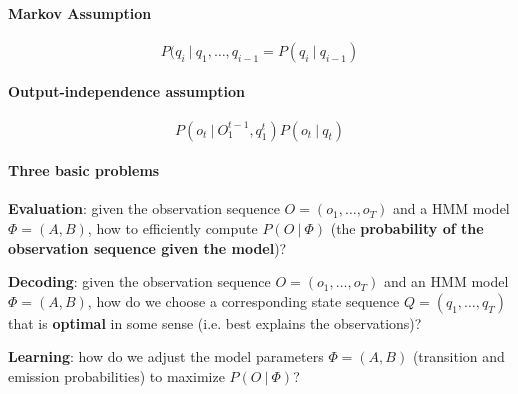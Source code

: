 \documentclass[10pt]{report}
\begin{document}
\paragraph{Markov Assumption} $$P(q_i\:|\:q_1,\ldots,q_{i-1} = P(q_i\:|\:q_{i-1})$$
\paragraph{Output-independence assumption} $$P(o_t\:|\:O_1^{t-1},q_1^t)P(o_t\:|\:q_t)$$
\paragraph{Three basic problems}
\begin{list}{}{}
	\item \textbf{Evaluation}: given the observation sequence $O = (o_1,\ldots,o_T)$ and a HMM model $\Phi = (A, B)$, how to efficiently compute $P(O\:|\:\Phi)$ (the \textbf{probability of the observation sequence given the model})?
	\item \textbf{Decoding}: given the observation sequence $O = (o_1,\ldots,o_T)$ and an HMM model $\Phi = (A, B)$, how do we choose a corresponding state sequence $Q = (q_1,\ldots,q_T)$ that is \textbf{optimal} in some sense (i.e. best explains the observations)?
	\item \textbf{Learning}: how do we adjust the model parameters $\Phi = (A,B)$ (transition and emission probabilities) to maximize $P(O\:|\:\Phi)$?
\end{list}
\end{document}
